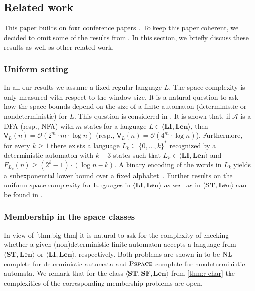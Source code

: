 \documentclass{theoretics}
\newcommand{\A}{\mathcal{A}}
\renewcommand{\O}{\mathcal{O}}
\newcommand{\V}{\mathsf{V}}
\newcommand{\NL}{\textsc{NL}}
\newcommand{\PSPACE}{\textsc{Pspace}}
\newcommand{\Len}{\mathbf{Len}}
\newcommand{\LI}{\mathbf{LI}}
\newcommand{\ST}{\mathbf{ST}}
\newcommand{\SF}{\mathbf{SF}}
\renewcommand{\geq}{\geqslant}
\renewcommand{\ge}{\geq}
\begin{document}
\subsection{Related work} \label{sec-related}

This paper builds on four conference papers \cite{GanardiHKLM18,GanardiHL16,GanardiHL18,GanardiHLS19}.
To keep this paper coherent, we decided to omit some of the results from \cite{GanardiHKLM18,GanardiHL16,GanardiHL18,GanardiHLS19}. In this section, we briefly
discuss these results as well as other related work.

\label{sec:omitted}

\subsubsection{Uniform setting}

In all our results we assume a fixed regular language $L$. The space complexity is only measured with respect
to the window size. It is a natural question to ask how the space bounds depend on the size of a finite automaton
(deterministic or nondeterministic) for $L$. This question is considered in \cite{GanardiHKLM18}.
It is shown that,
if $\A$ is a DFA (resp., NFA) with $m$ states for a language $L \in \langle \LI, \Len \rangle$,
then $\V_L(n) = \O(2^m \cdot m \cdot \log n)$ (resp., $\V_L(n)=\O(4^m \cdot \log n)$).
Furthermore, for every 
$k \ge 1$ there exists a language $L_k \subseteq \{0, \ldots, k\}^*$
recognized by a deterministic automaton with $k+3$ states
such that $L_k \in \langle \LI, \Len \rangle$ and 
$F_{L_k}(n) \geq (2^k-1) \cdot (\log n - k)$.
A binary encoding of the words in $L_k$ yields a subexponential lower bound over a fixed alphabet~\cite[Theorem~4.45]{GanardiPhD}.
Further results on the uniform space complexity for languages in $\langle \LI, \Len \rangle$ as well as in $\langle \ST, \Len \rangle$ can be found in \cite[Section~4.3]{GanardiPhD}.

\subsubsection{Membership in the space classes}

In view of \cref{thm:big-thm} it is natural to ask for the complexity of checking whether a given (non)deterministic
finite automaton accepts a language from $\langle \ST, \Len \rangle$ or $\langle \LI, \Len \rangle$, respectively.
Both problems are shown in \cite{GanardiHKLM18} to be $\NL$-complete for deterministic automata and $\PSPACE$-complete for 
nondeterministic automata. We remark that for the class  $\langle \ST, \SF, \Len \rangle$ from 
\cref{thm:r-char} the complexities of the corresponding membership problems are open.
\end{document}
